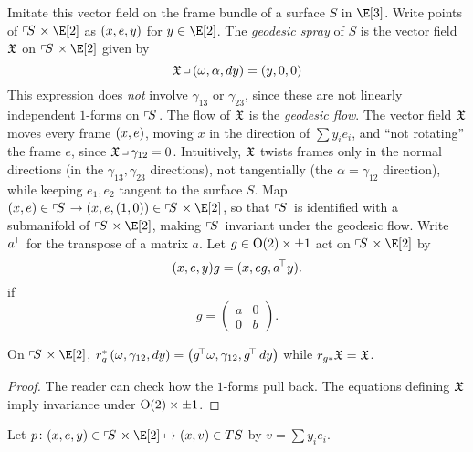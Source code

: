 Imitate this vector field on the frame bundle of a surface \(S\) in \(\E[3]\).
Write points of \(\frameBundle{S} \times \E[2]\) as \(\left(x,e,y\right)\) for \(y \in \E[2]\).
The \emph{geodesic spray} of \(S\) is  the vector field \(\mathfrak{X}\) on \(\frameBundle{S} \times \E[2]\) given by
\[
\geodesicVectorField \hook \pr{\omega,\alpha,dy}=\pr{y,0,0}
\]
This expression does \emph{not} involve \(\gamma_{13}\) or \(\gamma_{23}\), since these are not linearly independent \(1\)-forms on \(\left\ulcorner\!S\right.\).
The flow of \(\mathfrak{X}\) is the \emph{geodesic flow}.%
The vector field \(\mathfrak{X}\) moves every frame \(\left(x,e\right)\), moving \(x\) in the direction of \(\sum y_i e_i\), and ``not rotating'' the frame \(e\), since \(\geodesicVectorField \hook \gamma_{12}=0\).
Intuitively, \(\mathfrak{X}\) twists frames only in the normal directions (in the \(\gamma_{13}, \gamma_{23}\) directions), not tangentially (the \(\alpha=\gamma_{12}\) direction), while keeping \(e_1,e_2\) tangent to the surface \(S\).
Map \(\pr{x,e} \in \frameBundle{S} \to \pr{x,e,(1,0)} \in \frameBundle{S} \times \E[2]\), so that \(\left\ulcorner\!S\right.\) is identified with a submanifold of \(\frameBundle{S} \times \E[2]\), making \(\left\ulcorner\!S\right.\) invariant under the geodesic flow.
Write \(a^{\!\top}\) for the transpose of a matrix \(a\).
Let \(g \in \textrm{O}\!\left(2\right) \times \pm 1\) act on \(\frameBundle{S}\times\E[2]\) by
\[
(x,e,y)g=(x,eg,a^{\!\top} y).
\]
if
\[
g = \begin{pmatrix}
        a & 0 \\
        0 & b
       \end{pmatrix}.
\]

\begin{lemma}
On \(\frameBundle{S} \times \E[2]\), \(r^*_g \left(\omega,\gamma_{12},dy\right)=\left(g^{\!\top} \omega, \gamma_{12}, g^{\!\top} \, dy\right)\) while \(r_{g*} \mathfrak{X}=\mathfrak{X}\).
\end{lemma}
\begin{proof}
The reader can check how the \(1\)-forms pull back.
The equations defining \(\mathfrak{X}\) imply invariance under \(\textrm{O}\!\left(2\right) \times \pm 1\).
\end{proof}

Let \(p \colon (x,e,y) \in \frameBundle{S} \times \E[2] \mapsto (x,v) \in TS\) by \(v=\sum y_i e_i\).

